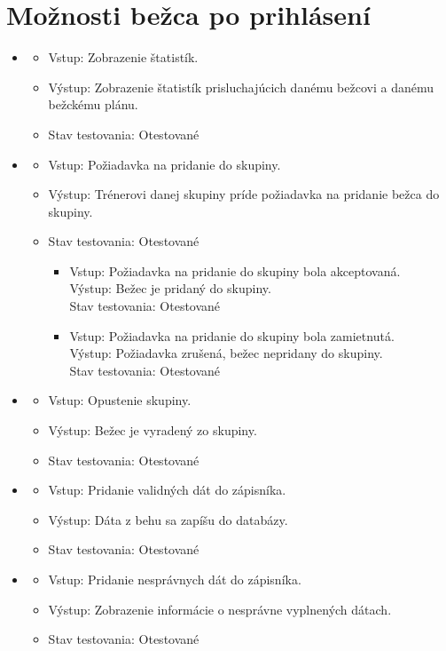 \documentclass[12pt,a4paper]{report}
\theoremstyle{definition}
\theoremstyle{remark}
\begin{document}
\section{Možnosti bežca po prihlásení}
\begin{itemize}
	\item\begin{itemize}
	\item Vstup: Zobrazenie štatistík.
	\item Výstup: Zobrazenie štatistík prisluchajúcich danému bežcovi a danému bežckému plánu.
	\item Stav testovania: Otestované
	\end{itemize}
	
	\item\begin{itemize}
	\item Vstup: Požiadavka na pridanie do skupiny.
	\item Výstup: Trénerovi danej skupiny príde požiadavka na pridanie bežca do skupiny.
	\item Stav testovania: Otestované
		\begin{itemize}
		\item Vstup: Požiadavka na pridanie do skupiny bola akceptovaná. \\
		Výstup: Bežec je pridaný do skupiny. \\
		Stav testovania: Otestované
		\item Vstup: Požiadavka na pridanie do skupiny bola zamietnutá. \\
		Výstup: Požiadavka zrušená, bežec nepridany do skupiny. \\
		Stav testovania: Otestované
		\end{itemize}
	\end{itemize}
	
	\item\begin{itemize}
	\item Vstup: Opustenie skupiny.
	\item Výstup: Bežec je vyradený zo skupiny.
	\item Stav testovania: Otestované
	\end{itemize}
	
	\item\begin{itemize}
	\item Vstup: Pridanie validných dát do zápisníka.
	\item Výstup: Dáta z behu sa zapíšu do databázy.
	\item Stav testovania: Otestované
	\end{itemize}
	
	\item\begin{itemize}
	\item Vstup: Pridanie nesprávnych dát do zápisníka.
	\item Výstup: Zobrazenie informácie o nesprávne vyplnených dátach.
	\item Stav testovania: Otestované
	\end{itemize}
	
\end{itemize}
\end{document}
